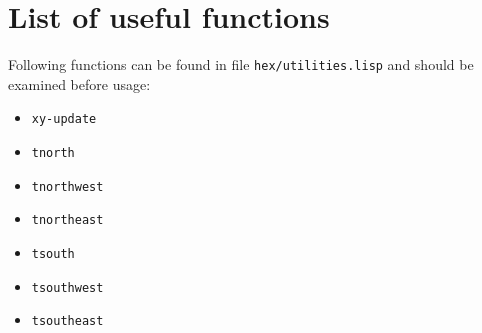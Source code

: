 \documentclass[a4paper,12pt]{article}
\begin{document}
\section*{List of useful functions}
Following functions can be found in file \texttt{hex/utilities.lisp} and should be examined before usage:
\begin{itemize}
\item \texttt{xy-update}
\item \texttt{tnorth}
\item \texttt{tnorthwest}
\item \texttt{tnortheast}
\item \texttt{tsouth}
\item \texttt{tsouthwest}
\item \texttt{tsoutheast}
\end{itemize}
\end{document}
